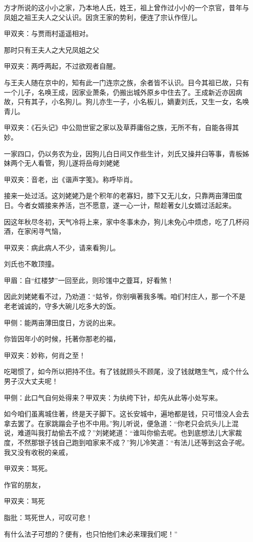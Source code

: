 \begin{parag}
    方才所说的这小小之家，乃本地人氏，姓王，祖上曾作过小小的一个京官，昔年与凤姐之祖王夫人之父认识。因贪王家的势利，便连了宗认作侄儿。\begin{note}甲双夹：与贾雨村遥遥相对。\end{note}那时只有王夫人之大兄凤姐之父\begin{note}甲双夹：两呼两起，不过欲观者自醒。\end{note}与王夫人随在京中的，知有此一门连宗之族，余者皆不认识。目今其祖已故，只有一个儿子，名唤王成，因家业萧条，仍搬出城外原乡中住去了。王成新近亦因病故，只有其子，小名狗儿。狗儿亦生一子，小名板儿，嫡妻刘氏，又生一女，名唤青儿。\begin{note}甲双夹：《石头记》中公勋世宦之家以及草莽庸俗之族，无所不有，自能各得其妙。\end{note}一家四口，仍以务农为业，因狗儿白日间又作些生计，刘氏又操井臼等事，青板姊妹两个无人看管，狗儿遂将岳母刘姥姥\begin{note}甲双夹：音老，出《谐声字笺》。称呼毕肖。\end{note}接来一处过活。这刘姥姥乃是个积年的老寡妇，膝下又无儿女，只靠两亩薄田度日。今者女婿接来养活，岂不愿意，遂一心一计，帮趁著女儿女婿过活起来。
\end{parag}


\begin{parag}
    因这年秋尽冬初，天气冷将上来，家中冬事未办，狗儿未免心中烦虑，吃了几杯闷酒，在家闲寻气恼，\begin{note}甲双夹：病此病人不少，请来看狗儿。\end{note}刘氏也不敢顶撞。\begin{note}甲眉：自“红楼梦”一回至此，则珍馐中之虀耳，好看煞！\end{note}因此刘姥姥看不过，乃劝道：“姑爷，你别嗔著我多嘴。咱们村庄人，那一个不是老老诚诚的，守多大碗儿吃多大的饭。\begin{note}甲侧：能两亩薄田度日，方说的出来。\end{note}你皆因年小的时候，托著你那老的福，\begin{note}甲双夹：妙称，何肖之至！\end{note}吃喝惯了，如今所以把持不住。有了钱就顾头不顾尾，没了钱就瞎生气，成个什么男子汉大丈夫呢！\begin{note}甲侧：此口气自何处得来？甲双夹：为纨绔下针，却先从此等小处写来。\end{note}如今咱们虽离城住著，终是天子脚下。这长安城中，遍地都是钱，只可惜没人会去拿去罢了。在家跳蹋会子也不中用。”狗儿听说，便急道：“你老只会炕头儿上混说，难道叫我打劫偷去不成？”刘姥姥道：“谁叫你偷去呢。也到底想法儿大家裁度，不然那银子钱自己跑到咱家来不成？”狗儿冷笑道：“有法儿还等到这会子呢。我又没有收税的亲戚，\begin{note}甲双夹：骂死。\end{note}作官的朋友，\begin{note}甲双夹：骂死\end{note}\begin{note}脂批：骂死世人，可叹可悲！\end{note}有什么法子可想的？便有，也只怕他们未必来理我们呢！”
\end{parag}


